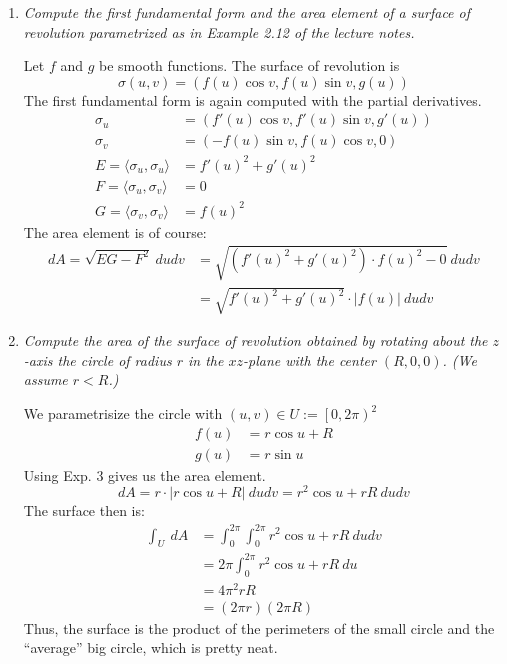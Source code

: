 \documentclass[a4paper,11pt,notitlepage,fullpage]{article}
\begin{document}
\begin{enumerate}
\item \emph{Compute the first fundamental form and the area element of a surface of revolution parametrized as in Example 2.12 of the lecture notes.}

Let $f$ and $g$ be smooth functions. The surface of revolution is
\begin{equation*}
\sigma\left(u,v\right) = \left(f\left(u\right) \cos v, f\left(u\right)\sin v, g\left(u\right)\right)
\end{equation*}
The first fundamental form is again computed with the partial derivatives.
\begin{align*}
\sigma_u &= \left(f'\left(u\right) \cos v, f'\left(u\right) \sin v, g'\left(u\right)\right) \\
\sigma_v &= \left(-f\left(u\right) \sin v, f\left(u\right) \cos v, 0\right) \\
E = \langle\sigma_u, \sigma_u\rangle &= f'\left(u\right)^2 + g'\left(u\right)^2 \\
F = \langle\sigma_u, \sigma_v\rangle &= 0 \\
G = \langle\sigma_v, \sigma_v\rangle &= f\left(u\right)^2
\end{align*}
The area element is of course:
\begin{align*}
dA = \sqrt{EG-F^2}~dudv &= \sqrt{\left(f'\left(u\right)^2 + g'\left(u\right)^2\right)\cdot f\left(u\right)^2-0} ~dudv \\
&= \sqrt{f'\left(u\right)^2 + g'\left(u\right)^2}\cdot |f\left(u\right)| ~dudv
\end{align*}

\item \emph{Compute the area of the surface of revolution obtained by rotating about the $z$-axis the circle of radius $r$ in the $xz$-plane with the center $\left(R,0,0\right)$. (We assume $r < R$.)}

We parametrisize the circle with $\left(u,v\right) \in U := \left[0,2\pi\right)^2$
\begin{align*}
f\left(u\right) &= r\cos u + R \\
g\left(u\right) &= r\sin u
\end{align*}
Using Exp. 3 gives us the area element.
\begin{equation*}
dA = r \cdot |r\cos u + R| ~dudv = r^2\cos u + rR ~dudv
\end{equation*}
The surface then is:
\begin{align*}
\int_U ~dA &= \int_0^{2\pi}\int_0^{2\pi} r^2\cos u + rR ~dudv \\
&= 2\pi \int_0^{2\pi} r^2\cos u + rR ~du \\
&= 4\pi^2 rR \\
&= \left(2\pi r\right)\left(2\pi R\right)
\end{align*}
Thus, the surface is the product of the perimeters of the small circle and the ``average'' big circle, which is pretty neat.


\end{enumerate}
\end{document}
